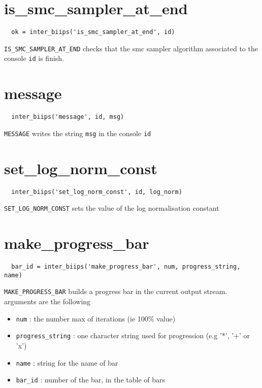 \documentclass[11pt]{article}
\begin{document}
\section{is\_smc\_sampler\_at\_end}

 \begin{lstlisting} 
  ok = inter_biips('is_smc_sampler_at_end', id)
 \end{lstlisting}
 \texttt{IS\_SMC\_SAMPLER\_AT\_END} checks that the smc sampler algorithm associated to the console \texttt{id} is finish.


\section{message}
 
 \begin{lstlisting} 
  inter_biips('message', id, msg)
 \end{lstlisting}

  \texttt{MESSAGE} writes the string \texttt{msg} in the console \texttt{id}

\section{set\_log\_norm\_const}

 \begin{lstlisting} 
  inter_biips('set_log_norm_const', id, log_norm)
 \end{lstlisting}
  
  \texttt{SET\_LOG\_NORM\_CONST} sets the value of the log normalisation constant

\section{make\_progress\_bar}

 \begin{lstlisting} 
  bar_id = inter_biips('make_progress_bar', num, progress_string, name)
 \end{lstlisting}

 \texttt{MAKE\_PROGRESS\_BAR} builds a progress bar in the current output stream. arguments are the following
 \begin{itemize}
  \item \texttt{num} : the number max of iterations (ie 100\% value)
  \item \texttt{progress\_string} : one character string used for progression (e.g '*', '+' or 'x')
  \item \texttt{name} : string for the name of bar
  \item \texttt{bar\_id} : number of the bar, in the table of bars
  \end{itemize}
\end{document}
